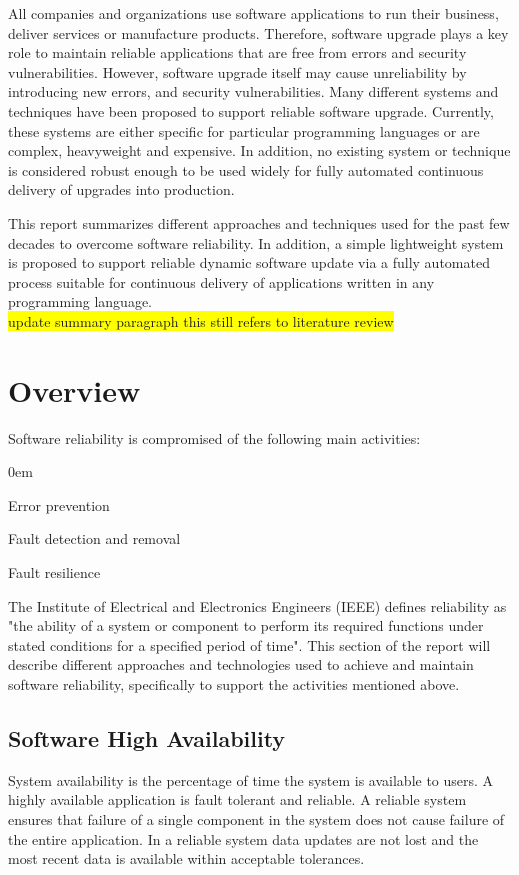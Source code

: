 \documentclass[a4paper,11pt,twoside]{article}
\begin{document}
All companies and organizations use software applications to run their business, deliver services or manufacture products. Therefore, software upgrade plays a key role to maintain reliable applications that are free from errors and security vulnerabilities. However, software upgrade itself may cause unreliability by introducing new errors, and security vulnerabilities. Many different systems and techniques have been proposed to support reliable software upgrade. Currently, these systems are either specific for particular programming languages or are complex, heavyweight and expensive. In addition, no existing system or technique is considered robust enough to be used widely for fully automated continuous delivery of upgrades into production.
 
{\color{red}This report summarizes different approaches and techniques used for the past few decades to overcome software reliability. In addition, a simple lightweight system is proposed to support reliable dynamic software update via a fully automated process suitable for continuous delivery of applications written in any programming language.}\\  
\colorbox{yellow}{update summary paragraph this still refers to literature review}

\clearpage
\section{Overview}
Software reliability is compromised of the following main activities:

  \begin{list}{-}{}
  \itemsep0em
  \item Error prevention 
  
  \item Fault detection and removal
  
  \item Fault resilience
  \end{list}

\noindent
The Institute of Electrical and Electronics Engineers (IEEE) defines reliability as "the ability of a system or component to perform its required functions under stated conditions for a specified period of time". 
This section of the report will describe different approaches and technologies used to achieve and maintain software reliability, specifically to support the activities mentioned above. 

\subsection{Software High Availability }\label{subsec:rules}
System availability is the percentage of time the system is available to users. A highly available application is fault tolerant and reliable. A reliable system ensures that failure of a single component in the system does not cause failure of the entire application. In a reliable system data updates are not lost and the most recent data is available within acceptable tolerances. 
\end{document}
